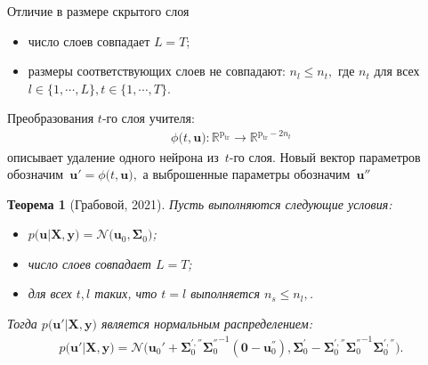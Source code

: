 \documentclass[10pt,pdf,hyperref={unicode}]{beamer}
\newtheorem{rustheorem}{Теорема}
\begin{document}
\begin{frame}{Отличие в размере скрытого слоя}
\begin{itemize}
    \item число слоев совпадает $L=T$;
    \item размеры соответствующих слоев не совпадают: $n_l \leq n_t,$ где $n_t$ для всех $l \in \{1,\cdots,L\}, t \in \{1,\cdots,T\}$.
\end{itemize}
Преобразования $t$-го слоя учителя:
\[
\begin{aligned}
\phi\bigr(t, \mathbf{u}\bigr) : \mathbb{R}^{\text{p}_{\text{tr}}} \to \mathbb{R}^{\text{p}_{\text{tr}}-2n_t}
\end{aligned}
\]
описывает удаление одного нейрона из~$t$-го слоя. Новый вектор параметров обозначим~$\mathbf{u}' =  \phi\bigr(t, \mathbf{u}\bigr),$ а выброшенные параметры обозначим~$\mathbf{u}''$

\begin{rustheorem}[Грабовой, 2021]
Пусть выполняются следующие условия:
\begin{itemize}
\item $p\bigr(\mathbf{u}|\mathbf{X}, \mathbf{y}\bigr) = \mathcal{N}\bigr(\mathbf{u}_0, \bm{\Sigma}_0\bigr)$;
\item число слоев совпадает $L=T$;
\item для всех $t, l$ таких, что $t=l$ выполняется $n_s \leq n_l,$.
\end{itemize}
Тогда $p\bigr(\mathbf{u}'|\mathbf{X}, \mathbf{y}\bigr)$ является нормальным распределением:
\[
\begin{aligned}
p\bigr(\mathbf{u}'|\mathbf{X}, \mathbf{y}\bigr) = \mathcal{N}\bigr(\mathbf{u}_{0}'+\bm{\Sigma}_0^{', ''}{\bm{\Sigma}_0^{''}}^{-1}\left(\mathbf{0} - \mathbf{u}_0^{''}\right), \bm{\Sigma}_0^{'}-\bm{\Sigma}_0^{', ''}{\bm{\Sigma}_0^{''}}^{-1}\bm{\Sigma}_0^{', ''}\bigr).
\end{aligned}
\]
\end{rustheorem}

\end{frame}
\end{document}
